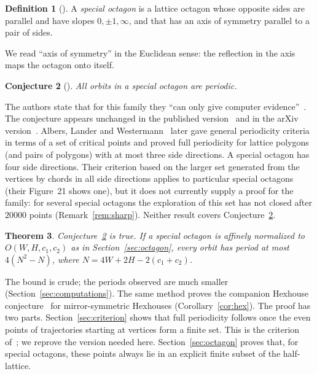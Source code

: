\documentclass[11pt]{amsart}
\newtheorem{theorem}{Theorem}[section]
\newtheorem{conjecture}[theorem]{Conjecture}
\theoremstyle{definition}
\newtheorem{definition}[theorem]{Definition}
\theoremstyle{remark}
\begin{document}
\begin{definition}[{\cite[Section~6]{ABS25}}]
A \emph{special octagon} is a lattice octagon whose opposite sides are parallel and have slopes $0,\pm1,\infty$, and that has an axis of symmetry parallel to a pair of sides.
\end{definition}

We read ``axis of symmetry'' in the Euclidean sense: the reflection in the axis maps the octagon onto itself.

\begin{conjecture}[{\cite[Conjecture~6.2]{ABS25}}]\label{conj}
All orbits in a special octagon are periodic.
\end{conjecture}

The authors state that for this family they ``can only give computer evidence''~\cite{ABS25}. The conjecture appears unchanged in the published version~\cite{ABS25} and in the arXiv version~\cite{ABS19}. Albers, Lander and Westermann~\cite{ALW26} later gave general periodicity criteria in terms of a set of critical points and proved full periodicity for lattice polygons (and pairs of polygons) with at most three side directions. A special octagon has four side directions. Their criterion based on the larger set generated from the vertices by chords in all side directions applies to particular special octagons (their Figure~21 shows one), but it does not currently supply a proof for the family: for several special octagons the exploration of this set has not closed after $20000$ points (Remark~\ref{rem:sharp}). Neither result covers Conjecture~\ref{conj}.

\begin{theorem}\label{thm:main}
Conjecture~\ref{conj} is true. If a special octagon is affinely normalized to $O(W,H,c_1,c_2)$ as in Section~\ref{sec:octagon}, every orbit has period at most $4(N^2-N)$, where $N=4W+2H-2(c_1+c_2)$.
\end{theorem}

The bound is crude; the periods observed are much smaller (Section~\ref{sec:computations}). The same method proves the companion Hexhouse conjecture~\cite[Conjecture~6.1]{ABS25} for mirror-symmetric Hexhouses (Corollary~\ref{cor:hex}). The proof has two parts. Section~\ref{sec:criterion} shows that full periodicity follows once the even points of trajectories starting at vertices form a finite set. This is the criterion of~\cite{ALW26}; we reprove the version needed here. Section~\ref{sec:octagon} proves that, for special octagons, these points always lie in an explicit finite subset of the half-lattice.
\end{document}
